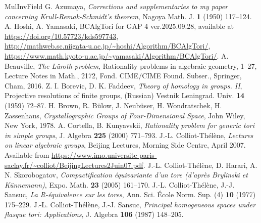 \documentclass{amsart}
\theoremstyle{plain}
\theoremstyle{definition}
\theoremstyle{remark}
\begin{document}
{%
\begin{thebibliography}{MulInvField}
G. Azumaya, 
{\it Corrections and supplementaries to my paper concerning 
Krull-Remak-Schmidt's theorem}, 
Nagoya Math. J. \textbf{1} (1950) 117--124. 
A. Hoshi, A. Yamasaki, 
BCAlgTori for GAP 4 ver.2025.09.28, 
available at \url{https://doi.org/10.57723/kds597743},\\ 
\url{http://mathweb.sc.niigata-u.ac.jp/~hoshi/Algorithm/BCAlgTori/},\\ 
\url{https://www.math.kyoto-u.ac.jp/~yamasaki/Algorithm/BCAlgTori/}. 
A. Beauville, {\it The L\"uroth problem}, 
Rationality problems in algebraic geometry, 1--27, 
Lecture Notes in Math., 2172, 
Fond. CIME/CIME Found. Subser., Springer, Cham, 2016. 
Z. I. Borevic, D. K. Faddeev, 
{\it Theory of homology in groups. II}, 
Projective resolutions of finite groups, (Russian)
Vestnik Leningrad. Univ. \textbf{14} (1959) 72--87. %
H. Brown, R. B\"ulow, J. Neub\"user, H. Wondratschek, H. Zassenhaus, 
{\it Crystallographic Groups of Four-Dimensional Space}, 
John Wiley, New York, 1978. 
A. Cortella, B. Kunyavskii, 
{\it Rationality problem for generic tori in simple groups}, 
J. Algebra \textbf{225} (2000) 771--793. 
J.-L. Colliot-Th\'{e}l\`{e}ne, 
{\it Lectures on linear algebraic groups}, 
Beijing Lectures, Morning Side Centre, April 2007. 
Available from \url{https://www.imo.universite-paris-saclay.fr/~colliot/BeijingLectures2Juin07.pdf}.
J.-L. Colliot-Th\'{e}l\`{e}ne, D. Harari, A. N. Skorobogatov, 
{\it Compactification \'equivariante d'un tore 
(d'apr\`es Brylinski et K\"unnemann)}, 
Expo. Math. \textbf{23} (2005) 161--170.
J.-L. Colliot-Th\'{e}l\`{e}ne, J.-J. Sansuc, 
{\it La R-\'{e}quivalence sur les tores}, 
Ann. Sci. \'{E}cole Norm. Sup. (4) \textbf{10} (1977) 175--229. 
J.-L. Colliot-Th\'{e}l\`{e}ne, J.-J. Sansuc, 
{\it Principal homogeneous spaces under flasque tori: Applications}, 
J. Algebra \textbf{106} (1987) 148--205. 

\end{thebibliography}}
\end{document}
